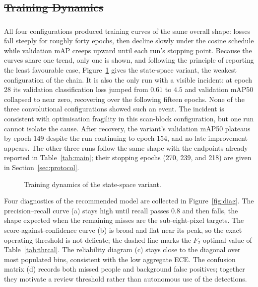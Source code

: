 \documentclass[12pt,a4paper,oneside]{report}
\providecommand{\DIFadd}[1]{{\protect\color{blue}\uwave{#1}}} %
\providecommand{\DIFdel}[1]{{\protect\color{red}\sout{#1}}}                      %
\providecommand{\DIFaddbegin}{} %
\providecommand{\DIFaddend}{} %
\providecommand{\DIFdelbegin}{} %
\providecommand{\DIFdelend}{} %
\begin{document}
\DIFdelbegin \subsection{\DIFdel{Training Dynamics}}
\addtocounter{subsection}{-1}%
\DIFdelend \DIFaddbegin \subsubsection{\DIFadd{Training Dynamics}}
\DIFaddend All four configurations produced training curves of the same overall shape:
losses fall steeply for roughly forty epochs, then decline slowly under the
cosine schedule while validation mAP creeps upward until each run's stopping
point. Because the curves share one trend, only one is shown, and following
the principle of reporting the least favourable case, Figure~\ref{fig:training}
gives the state-space variant, the weakest configuration of the chain. It is
also the only run with a visible incident: at epoch 28 its validation
classification loss jumped from $0.61$ to $4.5$ and validation mAP50 collapsed
to near zero, recovering over the following fifteen epochs. None of the three
convolutional configurations showed such an event. The incident is consistent
with optimisation fragility in this scan-block configuration, but one run
cannot isolate the cause. After recovery, the variant's validation mAP50 plateaus by epoch
149 despite the run continuing to epoch 154, and no late improvement appears. The other three runs follow the same
shape with the endpoints already reported in Table~\ref{tab:main}; their
stopping epochs (270, 239, and 218) are given in Section~\ref{sec:protocol}.

\begin{figure}[tbp]
  \centering
  \caption{Training dynamics of the state-space variant.}
  \label{fig:training}
\end{figure}

Four diagnostics of the recommended model are collected in
Figure~\ref{fig:diag}. The precision--recall curve (a) stays high until
recall passes $0.8$ and then falls, the shape expected when the remaining
misses are the sub-eight-pixel targets. The score-against-confidence curve
(b) is broad and flat near its peak, so the exact operating threshold is not
delicate; the dashed line marks the $F_2$-optimal value of
Table~\ref{tab:thrcal}. The reliability diagram (c) stays close to the
diagonal over most populated bins, consistent with the low aggregate ECE.
The confusion matrix (d) records both missed people and background false
positives; together they motivate a review threshold rather than autonomous
use of the detections.
\end{document}
